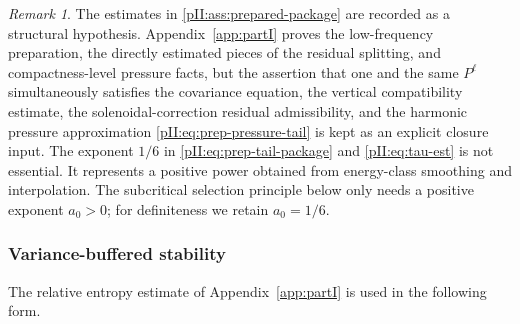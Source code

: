\documentclass[11pt]{article}
\numberwithin{equation}{section}
\theoremstyle{plain}
\theoremstyle{definition}
\theoremstyle{remark}
\newtheorem{remark}{Remark}[section]
\begin{document}
\begin{remark}
The estimates in \cref{pII:ass:prepared-package} are recorded as a structural hypothesis.  Appendix~\ref{app:partI} proves the low-frequency preparation, the directly estimated pieces of the residual splitting, and compactness-level pressure facts, but the assertion that one and the same \(P^\ell\) simultaneously satisfies the covariance equation, the vertical compatibility estimate, the solenoidal-correction residual admissibility, and the harmonic pressure approximation \eqref{pII:eq:prep-pressure-tail} is kept as an explicit closure input.  The exponent $1/6$ in \eqref{pII:eq:prep-tail-package} and \eqref{pII:eq:tau-est} is not essential.  It represents a positive power obtained from energy-class smoothing and interpolation.  The subcritical selection principle below only needs a positive exponent $a_0>0$; for definiteness we retain $a_0=1/6$.
\end{remark}

\subsubsection{Variance-buffered stability}

The relative entropy estimate of Appendix~\ref{app:partI} is used in the following form.
\end{document}
